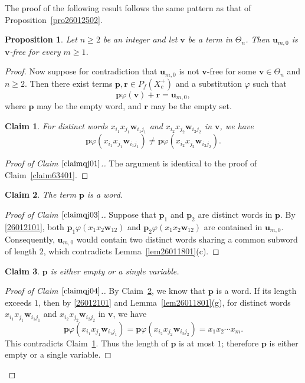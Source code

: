 \documentclass[reqno]{amsart}
\theoremstyle{plain}
\newtheorem{pro}[thm]{Proposition}
\newtheorem{claim}{Claim}[section]
\theoremstyle{definition}
\newcommand{\bp}{\mathbf{p}}
\newcommand{\br}{\mathbf{r}}
\newcommand{\bu}{\mathbf{u}}
\newcommand{\bv}{\mathbf{v}}
\newcommand{\bw}{\mathbf{w}}
\begin{document}
The proof of the following result follows the same pattern as that of Proposition~\ref{pro26012502}.
\begin{pro}\label{lem06}
Let $n\geq2$ be an integer and let $\bv$ be a term in $\Theta_n$. Then $\bu_{m,0}$ is $\bv$-free for every $m\geq 1$.
\end{pro}
\begin{proof}
Now suppose for contradiction that $\bu_{m, 0}$ is not $\bv$-free for some $\bv\in \Theta_n$ and $n\geq2$.
Then there exist terms $\bp, \br\in P_f(X_c^+)$ and a substitution $\varphi$ such that
\begin{equation}\label{26012101}
\bp\varphi(\bv)+\br=\bu_{m,0},
\end{equation}
where $\bp$ may be the empty word, and $\br$ may be the empty set.

\begin{claim}\label{claimqj01}
For distinct words $x_{i_1}x_{j_1}\bw_{i_1j_1}$ and $x_{i_2}x_{j_2}\bw_{i_2j_2}$ in $\bv$,
we have
\[
\bp\varphi(x_{i_1}x_{j_1}\bw_{i_1j_1})\neq\bp\varphi(x_{i_2}x_{j_2}\bw_{i_2j_2}).
\]
\end{claim}
\begin{proof}[Proof of Claim $\ref{claimqj01}$.]
The argument is identical to the proof of Claim~\ref{claim63401}.
\end{proof}

\begin{claim}\label{claimqj03}
The term $\bp$ is a word.
\end{claim}
\begin{proof}[Proof of Claim $\ref{claimqj03}$.]
Suppose that $\bp_1$ and $\bp_2$ are distinct words in $\bp$.
By \eqref{26012101}, both $\bp_1\varphi(x_1x_2\bw_{12})$ and $\bp_2\varphi(x_1x_2\bw_{12})$ are contained in $\bu_{m,0}$.
Consequently, $\bu_{m,0}$ would contain two distinct words sharing a common subword of length $2$,
which contradicts Lemma~\ref{lem26011801}(c).
\end{proof}


\begin{claim}\label{claimqj04}
$\bp$ is either empty or a single variable.
\end{claim}
\begin{proof}[Proof of Claim $\ref{claimqj04}$.]
By Claim~\ref{claimqj03}, we know that $\bp$ is a word.
If its length exceeds $1$, then by \eqref{26012101} and Lemma~\ref{lem26011801}(g),
for distinct words $x_{i_1}x_{j_1}\bw_{i_1j_1}$ and $x_{i_2}x_{j_2}\bw_{i_2j_2}$ in $\bv$,
we have
\[
\bp\varphi(x_{i_1}x_{j_1}\bw_{i_1j_1})=\bp\varphi(x_{i_2}x_{j_2}\bw_{i_2j_2})=x_1x_2\cdots x_m.
\]
This contradicts Claim~\ref{claimqj01}.
Thus the length of $\bp$ is at most $1$;
therefore $\bp$ is either empty or a single variable.
\end{proof}


\end{proof}
\end{document}

